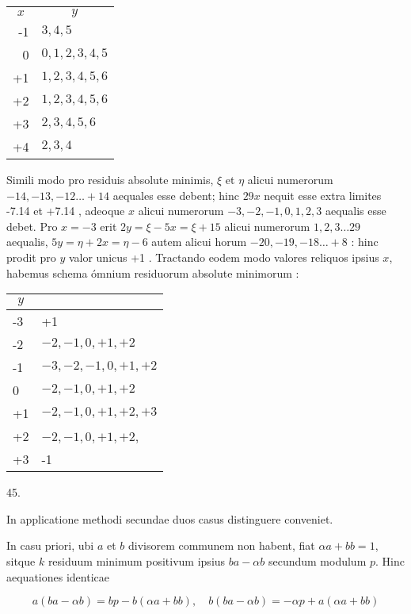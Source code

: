 \documentclass[10pt]{article}
\begin{document}
\begin{center}
\begin{tabular}{r|l}
\multicolumn{1}{c|}{\(x\)} & \multicolumn{1}{|c}{\(y\)} \\
\cline { 2 - 2 }
-1 & \(3,4,5\) \\
0 & \(0,1,2,3,4,5\) \\
+1 & \(1,2,3,4,5,6\) \\
+2 & \(1,2,3,4,5,6\) \\
+3 & \(2,3,4,5,6\) \\
+4 & \(2,3,4\) \\
\end{tabular}
\end{center}

Simili modo pro residuis absolute minimis, \(\xi\) et \(\eta\) alicui numerorum \(-14,-13,-12 \ldots+14\) aequales esse debent; hinc \(29 x\) nequit esse extra limites -7.14 et +7.14 , adeoque \(x\) alicui numerorum \(-3,-2,-1,0,1,2,3\) aequalis esse debet. Pro \(x=-3\) erit \(2 y=\xi-5 x=\xi+15\) alicui numerorum \(1,2,3 \ldots 29\) aequalis, \(5 y=\eta+2 x=\eta-6\) autem alicui horum \(-20,-19,-18 \ldots+8\) : hinc prodit pro \(y\) valor unicus +1 . Tractando eodem modo valores reliquos ipsius \(x\), habemus schema ómnium residuorum absolute minimorum :

\begin{center}
\begin{tabular}{l|l}
\multicolumn{1}{c|}{\(y\)} &  \\
\hline
-3 & +1 \\
-2 & \(-2,-1,0,+1,+2\) \\
-1 & \(-3,-2,-1,0,+1,+2\) \\
0 & \(-2,-1,0,+1,+2\) \\
+1 & \(-2,-1,0,+1,+2,+3\) \\
+2 & \(-2,-1,0,+1,+2\), \\
+3 & -1 \\
\end{tabular}
\end{center}

45.

In applicatione methodi secundae duos casus distinguere conveniet.

In casu priori, ubi \(a\) et \(b\) divisorem communem non habent, fiat \(\alpha a+b b=1\), sitque \(k\) residuum minimum positivum ipsius \(b a-\alpha b\) secundum modulum \(p\). Hinc aequationes identicae

\[
a(b a-\alpha b)=b p-b(\alpha a+b b), \quad b(b a-\alpha b)=-\alpha p+a(\alpha a+b b)
\]
\end{document}
